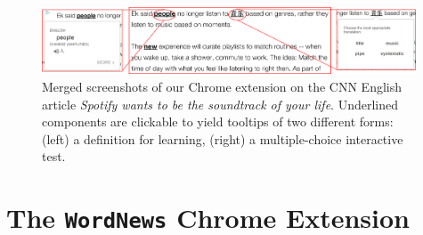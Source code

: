 

\begin{figure}[ht]
\centering
\includegraphics[width=0.99\textwidth]{chrome_extension_new_3.png}
\caption{Merged screenshots of our Chrome extension on the CNN English
  article 
  {\it  Spotify wants to be the soundtrack of your life}.
    Underlined components are clickable to yield
  tooltips of two different forms: (left) a definition for learning, (right)
  a multiple-choice interactive test.}
\label{fig:chrome_extension_1}
\end{figure}

\section{The {\tt WordNews} Chrome Extension}

